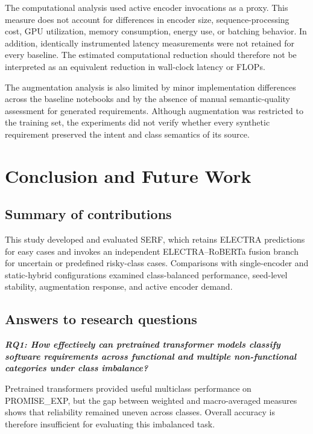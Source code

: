 \documentclass[runningheads]{llncs}
\begin{document}
The computational analysis used active encoder invocations as a proxy. This measure does not account for differences in encoder size, sequence-processing cost, GPU utilization, memory consumption, energy use, or batching behavior. In addition, identically instrumented latency measurements were not retained for every baseline. The estimated computational reduction should therefore not be interpreted as an equivalent reduction in wall-clock latency or FLOPs.

The augmentation analysis is also limited by minor implementation differences across the baseline notebooks and by the absence of manual semantic-quality assessment for generated requirements. Although augmentation was restricted to the training set, the experiments did not verify whether every synthetic requirement preserved the intent and class semantics of its source.

\section{Conclusion and Future Work}\label{sec:conclusion}

\subsection*{Summary of contributions}\label{sec:summary-contributions}

This study developed and evaluated SERF, which retains ELECTRA predictions for easy cases and invokes an independent ELECTRA--RoBERTa fusion branch for uncertain or predefined risky-class cases. Comparisons with single-encoder and static-hybrid configurations examined class-balanced performance, seed-level stability, augmentation response, and active encoder demand.

\subsection*{Answers to research questions}\label{sec:answers-rqs}

\emph{\textbf{RQ1: How effectively can pretrained transformer models classify software requirements across functional and multiple non-functional categories under class imbalance?}}

Pretrained transformers provided useful multiclass performance on PROMISE\_EXP, but the gap between weighted and macro-averaged measures shows that reliability remained uneven across classes. Overall accuracy is therefore insufficient for evaluating this imbalanced task.
\end{document}
